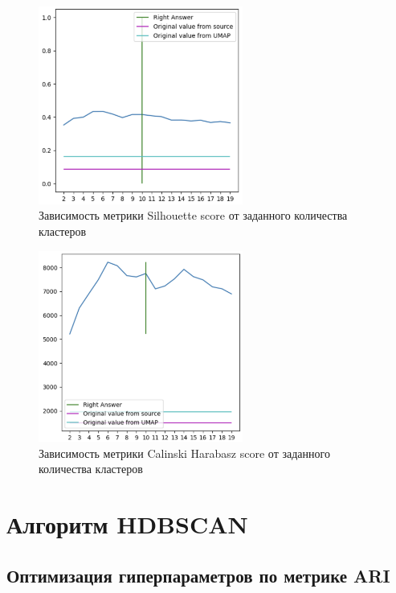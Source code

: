 \begin{figure}
	\begin{center}
		\includegraphics[width=0.6\textwidth]{images/12.png}
	\end{center}
	\caption{Зависимость метрики Silhouette score от заданного количества кластеров}
	\label{img:10}
\end{figure}

\begin{figure}
	\begin{center}
		\includegraphics[width=0.6\textwidth]{images/13.png}
	\end{center}
	\caption{Зависимость метрики Calinski Harabasz score от заданного количества кластеров}
	\label{img:11}
\end{figure}

\FloatBarrier

\section{Алгоритм HDBSCAN}

\subsection{Оптимизация гиперпараметров по метрике ARI}


